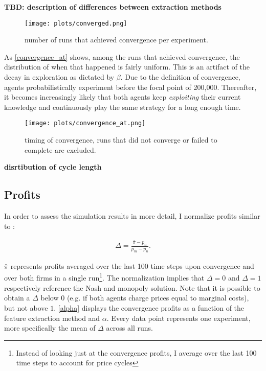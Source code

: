 \textbf{TBD: description of differences between extraction methods}

\begin{figure}
	\texttt{[image: plots/converged.png]}
	\caption{number of runs that achieved convergence per experiment.}
	\label{converged}
\end{figure}

As \autoref{convergence_at} shows, among the runs that achieved convergence, the distribution of when that happened is fairly uniform. This is an artifact of the decay in exploration as dictated by $\beta$. Due to the definition of convergence, agents probabilistically experiment before the focal point of 200,000. Thereafter, it becomes increasingly likely that both agents keep \emph{exploiting} their current knowledge and continuously play the same strategy for a long enough time.

\begin{figure}
	\texttt{[image: plots/convergence\_at.png]}
	\caption{timing of convergence, runs that did not converge or failed to complete are excluded.}
	\label{convergence_at}
\end{figure}

\textbf{disrtibution of cycle length}

\clearpage
\subsection{Profits}

In order to assess the simulation results in more detail, I normalize profits similar to \textcite{calvano_algorithmic_2018}:

\begin{gather}
\Delta = \frac{\bar{\pi} - p_n}{p_m - p_n}.
\end{gather}

$\bar{\pi}$ represents profits averaged over the last 100 time steps upon convergence and over both firms in a single run\footnote{Instead of looking just at the convergence profits, I average over the last 100 time steps to account for price cycles}. The normalization implies that $\Delta = 0$ and $\Delta = 1$ respectively reference the Nash and monopoly solution. Note that it is possible to obtain a $\Delta$ below $0$ (e.g. if both agents charge prices equal to marginal costs), but not above $1$. \autoref{alpha} displays the convergence profits as a function of the feature extraction method and $\alpha$. Every data point represents one experiment, more specifically the mean of $\Delta$ across all runs.


